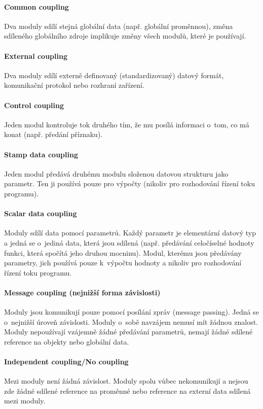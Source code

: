 \paragraph{Common coupling} Dva moduly sdílí stejná globální data (např. globální proměnnou), změna sdíleného globálního zdroje implikuje změny všech modulů, které je používají.

\paragraph{External coupling} Dva moduly sdílí externě definovaný (standardizovaný) datový formát, komunikační protokol nebo rozhraní zařízení.

\paragraph{Control coupling} Jeden modul kontroluje tok druhého tím, že mu posílá informaci o~tom, co má konat (např. předání  příznaku).

\paragraph{Stamp data coupling} Jeden modul předává druhému modulu složenou datovou strukturu jako parametr. Ten ji používá pouze pro výpočty (nikoliv pro rozhodování řízení toku programu).

\paragraph{Scalar data coupling} Moduly sdílí data pomocí parametrů. Každý parametr je elementární datový typ a jedná se o~jediná data, která jsou sdílená (např. předávání celočíselné hodnoty funkci, která spočítá jeho druhou mocninu). Modul, kterému jsou předávány parametry, jich používá pouze k~výpočtu hodnoty a nikoliv pro rozhodování řízení toku programu.

\paragraph{Message coupling (nejnižší forma závislosti)} Moduly jsou komunikují pouze pomocí posílání zpráv (message passing). Jedná se o~nejnižší úroveň závislosti. Moduly o~sobě navzájem nemusí mít žádnou znalost. Moduly nepoužívají vzájemně žádné předávání parametrů, nemají žádné sdílené reference na objekty nebo globální data.

\paragraph{Independent coupling/No coupling} Mezi moduly není žádná závislost. Moduly spolu vůbec nekomunikují a nejsou zde žádné sdílené reference na proměnné nebo reference na externí data sdílená mezi moduly.

